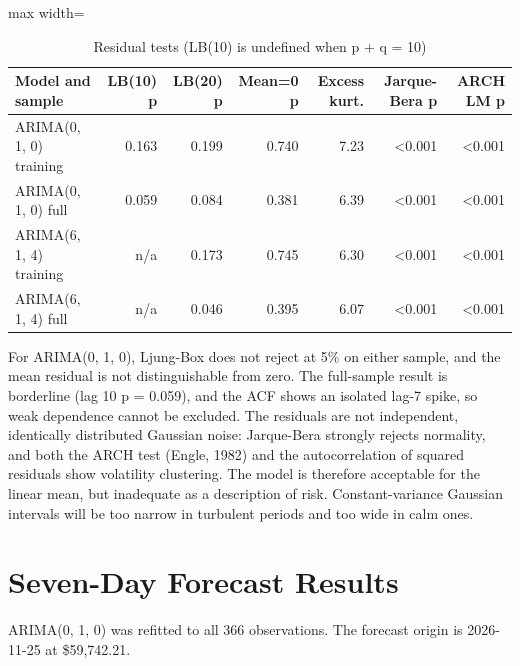 \documentclass[11pt,a4paper]{article}
\begin{document}
\begin{table}[H]
\centering
\caption{Residual tests (LB(10) is undefined when p + q = 10)}
\footnotesize
\setlength{\tabcolsep}{4pt}
\begin{adjustbox}{max width=\linewidth}
\begin{tabular}{lrrrrrr}
\toprule
\textbf{Model and sample} & \textbf{LB(10) p} & \textbf{LB(20) p} & \textbf{Mean=0 p} & \textbf{Excess kurt.} & \textbf{Jarque-Bera p} & \textbf{ARCH LM p} \\
\midrule
ARIMA(0, 1, 0) training & 0.163 & 0.199 & 0.740 & 7.23 & \textless{}0.001 & \textless{}0.001 \\
ARIMA(0, 1, 0) full & 0.059 & 0.084 & 0.381 & 6.39 & \textless{}0.001 & \textless{}0.001 \\
ARIMA(6, 1, 4) training & n/a & 0.173 & 0.745 & 6.30 & \textless{}0.001 & \textless{}0.001 \\
ARIMA(6, 1, 4) full & n/a & 0.046 & 0.395 & 6.07 & \textless{}0.001 & \textless{}0.001 \\
\bottomrule
\end{tabular}
\end{adjustbox}
\end{table}

For ARIMA(0, 1, 0), Ljung-Box does not reject at 5\% on either sample, and the mean residual is not distinguishable from zero. The full-sample result is borderline (lag 10 p = 0.059), and the ACF shows an isolated lag-7 spike, so weak dependence cannot be excluded. The residuals are not independent, identically distributed Gaussian noise: Jarque-Bera strongly rejects normality, and both the ARCH test (Engle, 1982) and the autocorrelation of squared residuals show volatility clustering. The model is therefore acceptable for the linear mean, but inadequate as a description of risk. Constant-variance Gaussian intervals will be too narrow in turbulent periods and too wide in calm ones.

\section{Seven-Day Forecast Results}

ARIMA(0, 1, 0) was refitted to all 366 observations. The forecast origin is 2026-11-25 at \$59,742.21.
\end{document}
